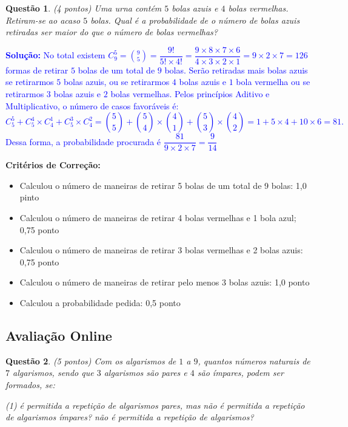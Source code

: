 \documentclass[oneside,a4paper,12pt]{article}
\newcommand{\negrito}[1]{\mbox{\boldmath{$#1$}}}
\theoremstyle{Colorido}
\theoremstyle{solu}
\theoremstyle{dotlessP}
\newcommand{\solucao}[1]{\textcolor{blue}{\textbf{Solução:} #1}}
\newtheorem{sol}{Questão}
\begin{document}
\newpage
	\begin{sol}
\textit{(4 pontos)} \newline \newline
Uma urna contém $5$ bolas azuis e $4$ bolas vermelhas. Retiram-se ao acaso $5$ bolas. Qual é a probabilidade de o número de bolas azuis retiradas ser maior do que o número de bolas vermelhas?
\end{sol}
\solucao{No total existem $C_9^5 = \binom{9}{5} =\dfrac{9!}{5!\times 4!}=\dfrac{9\times 8 \times 7 \times 6}{4\times 3\times 2\times 1}= 9\times 2 \times 7=126$ formas de retirar $5$ bolas de um total de $9$ bolas. Serão retiradas mais bolas azuis se retirarmos $5$ bolas azuis, ou se retirarmos $4$ bolas azuis e $1$ bola vermelha ou se retirarmos $3$ bolas azuis e $2$ bolas vermelhas. Pelos princípios Aditivo e Multiplicativo, o número de casos favoráveis é:\[C_5^5 + C_5^4 \times C_4^1 + C_5^3 \times C_4^2 = \binom{5}{5} + \binom{5}{4} \times \binom{4}{1} + \binom{5}{3} \times \binom{4}{2} = 1 + 5 \times 4 + 10 \times 6 = 81.\]
Dessa forma, a probabilidade procurada é $\dfrac{81}{9\times 2 \times 7}=\dfrac{9}{14}$}
\begin{mdframed}
\textbf{Critérios de Correção:} \\
\begin{itemize}
\item Calculou o número de maneiras de retirar 5 bolas de um total de 9 bolas: 1,0 pinto
\item Calculou o número de maneiras de retirar 4 bolas vermelhas e 1 bola azul; 0,75 ponto
\item Calculou o número de maneiras de retirar 3 bolas vermelhas e 2 bolas azuis: 0,75 ponto
\item Calculou o número de maneiras de retirar pelo menos 3 bolas azuis: 1,0 ponto
\item Calculou a probabilidade pedida: 0,5 ponto
\end{itemize}
\end{mdframed}
\newpage
	\textcolor{Floresta}{\section{Avaliação Online}}
	\begin{sol}
\textit{(5 pontos)} \newline \newline	
Com os algarismos de $1$ a $9$, quantos números naturais de $7$ algarismos, sendo que $3$ algarismos são pares e $4$ são ímpares, podem ser formados, se:

	\begin{tasks}[counter-format={(tsk[a])},label-width=3.6ex, label-format = {\bfseries}, column-sep = {20pt}](1)
\task[\textcolor{blue}{$\negrito{(a)} $}] é permitida a repetição de algarismos pares, mas não é permitida a repetição de algarismos ímpares?
\task[\textcolor{blue}{$\negrito{(b)} $}] não é permitida a repetição de algarismos?
\end{tasks}
\end{sol}
\end{document}
